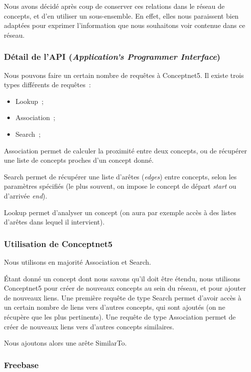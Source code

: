 \documentclass[a4paper, 12pt]{article}
\newcommand{\ang}[1]{\textit{#1}}%
\begin{document}
Nous avons décidé après coup de conserver ces relations dans le réseau de concepts, et d'en utiliser un sous-ensemble. En effet, elles nous paraissent bien adaptées pour exprimer l'information que nous souhaitons voir contenue dans ce réseau.

\subsubsection{Détail de l'API (\ang{Application's Programmer Interface})}

Nous pouvons faire un certain nombre de requêtes à Conceptnet5. Il existe trois types différents de requêtes~:
\begin{itemize}
 \item Lookup~;
 \item Association~;
 \item Search~;
\end{itemize}
Association permet de calculer la proximité entre deux concepts, ou de récupérer une liste de concepts proches d'un concept donné.

Search permet de récupérer une liste d'arêtes (\ang{edges}) entre concepts, selon les paramètres spécifiés (le plus souvent, on impose le concept de départ \ang{start} ou d'arrivée \ang{end}).

Lookup permet d'analyser un concept (on aura par exemple accès à des listes d'arêtes dans lequel il intervient).


\subsubsection{Utilisation de Conceptnet5}

Nous utilisons en majorité Association et Search.

Étant donné un concept dont nous savons qu'il doit être étendu, nous utilisons Conceptnet5 pour créer de nouveaux concepts au sein du réseau, et pour ajouter de nouveaux liens. Une première requête de type Search permet d'avoir accès à un certain nombre de liens vers d'autres concepts, qui sont ajoutés (on ne récupère que les plus pertinents). Une requête de type Association permet de créer de nouveaux liens vers d'autres concepts similaires.

Nous ajoutons alors une arête SimilarTo.

\subsubsection{Freebase}
\end{document}

